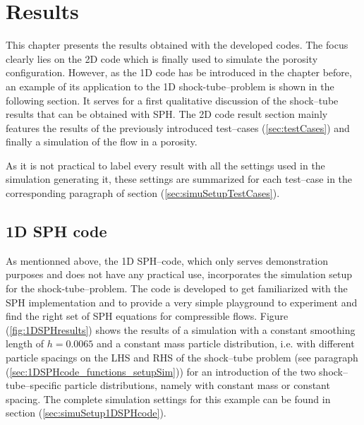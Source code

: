 \documentclass{report}
\begin{document}
\chapter{Results}
This chapter presents the results obtained with the developed codes. The focus clearly lies on the 2D code which is finally used to simulate the porosity configuration. However, as the 1D code has be introduced in the chapter before, an example of its application to the 1D shock-tube--problem is shown in the following section. It serves for a first qualitative discussion of the shock--tube results that can be obtained with SPH.
The 2D code result section mainly features the results of the previously introduced test--cases (\ref{sec:testCases}) and finally a simulation of the flow in a porosity.

As it is not practical to label every result with all the settings used in the simulation generating it, these settings are summarized for each test--case in the corresponding paragraph of section (\ref{sec:simuSetupTestCases}).

\section{1D SPH code}
\label{sec:1DSPHcodeResults}
As mentionned above, the 1D SPH--code, which only serves demonstration purposes and does not have any practical use, incorporates the simulation setup for the shock-tube--problem. The code is developed to get familiarized with the SPH implementation and to provide a very simple playground to experiment and find the right set of SPH equations for compressible flows. Figure (\ref{fig:1DSPHresults}) shows the results of a simulation with a constant smoothing length of $h=0.0065$ and a constant mass particle distribution, i.e. with different particle spacings on the LHS and RHS of the shock--tube problem (see paragraph (\ref{sec:1DSPHcode_functions_setupSim})) for an introduction of the two shock--tube--specific particle distributions, namely with constant mass or constant spacing. The complete simulation settings for this example can be found in section (\ref{sec:simuSetup1DSPHcode}). 
\end{document}
